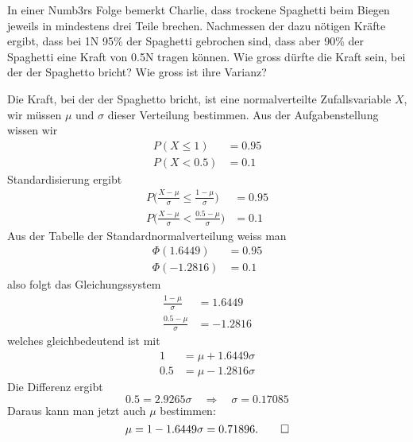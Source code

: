 In einer Numb3rs Folge bemerkt Charlie, dass trockene Spaghetti beim
Biegen jeweils
in mindestens drei Teile brechen. Nachmessen der dazu nötigen Kräfte
ergibt, dass bei 1N 95\% der Spaghetti gebrochen sind, dass aber 90\%
der Spaghetti eine Kraft von 0.5N tragen können. Wie gross dürfte
die Kraft sein, bei der der Spaghetto bricht? Wie gross ist ihre Varianz?


\begin{loesung}
Die Kraft, bei der der Spaghetto bricht, ist eine normalverteilte
Zufallsvariable $X$, wir müssen $\mu$ und $\sigma$ dieser Verteilung
bestimmen. Aus der Aufgabenstellung wissen wir
\begin{align*}
P(X \le 1)&=0.95\\
P(X < 0.5)&=0.1
\end{align*}
Standardisierung ergibt
\begin{align*}
P\biggl(\frac{X-\mu}{\sigma} \le \frac{1-\mu}{\sigma}\biggr)&=0.95\\
P\biggl(\frac{X-\mu}{\sigma} < \frac{0.5-\mu}{\sigma}\biggr)&=0.1
\end{align*}
Aus der Tabelle der Standardnormalverteilung weiss man
\begin{align*}
\Phi(1.6449)&=0.95\\
\Phi(-1.2816)&=0.1
\end{align*}
also folgt das Gleichungssystem
\begin{align*}
\frac{1-\mu}{\sigma}&=1.6449\\
\frac{0.5-\mu}{\sigma}&=-1.2816
\end{align*}
welches gleichbedeutend ist mit
\begin{align*}
1&=\mu+1.6449\sigma\\
0.5&=\mu-1.2816\sigma
\end{align*}
Die Differenz ergibt
\[
0.5 = 2.9265\sigma\quad\Rightarrow\quad \sigma = 0.17085
\]
Daraus kann man jetzt auch $\mu$ bestimmen:
\[
\mu = 1-1.6449\sigma =  0.71896.
\qedhere
\]
\end{loesung}

